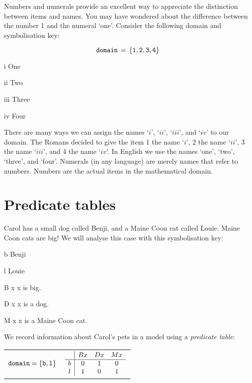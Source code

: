 \documentclass[PHIL101-Textbook.tex]{subfiles}
\begin{document}
Numbers and numerals provide an excellent way to appreciate the distinction between items and names. You may have wondered about the difference between the number 1 and the numeral `one'. Consider the following domain and symbolisation key:

\[\mathtt{domain} \, = \, \{\mathtt{1}, \mathtt{2}, \mathtt{3}, \mathtt{4} \}\]

\begin{ekey}
\item[i] One
\item[ii] Two
\item[iii] Three
\item[iv] Four
\end{ekey}

There are many ways we can assign the names `$i$', `$ii$', `$iii$', and `$iv$' to our domain. The Romans decided to give the item 1 the name `$i$', 2 the name `$ii$', 3 the name `$iii$', and 4 the name `$iv$'. In English we use the names `one', `two', `three', and `four'. Numerals (in any language) are merely names that refer to numbers. Numbers are the actual items in the mathematical domain.





\section{Predicate tables}

Carol has a small dog called Benji, and a Maine Coon cat called Louie. Maine Coon cats are big! We will analyse this case with this symbolisation key:  

\begin{ekey}
\item[b] Benji
\item[l] Louie
\item[\atom B x] x is big.
\item[\atom D x] x is a dog.
\item[\atom M x] x is a Maine Coon cat. 
\end{ekey}

\noindent We record information about Carol's pets in a model using a \emph{predicate table}:

\begin{center}
  \begin{tabular}{cc}
	$\mathtt{domain} = \{\mathtt{b}, \mathtt{l}\}$ & 
	$\begin{array}{c|ccc}
	    &\mathord{B}{x}& \mathord{D}{x}& \mathord{M}{x}\\ \hline
	  b & 0 & 1 & 0\\
	  l & 1 & 0 & 1
	\end{array}$
  \end{tabular}
\end{center}
\end{document}
